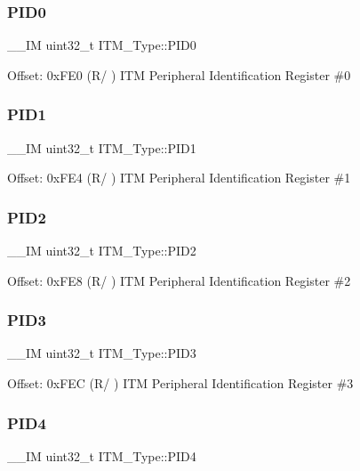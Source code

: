 \subsubsection{\texorpdfstring{PID0}{PID0}}
{\footnotesize\ttfamily \+\_\+\+\_\+\+IM uint32\+\_\+t I\+T\+M\+\_\+\+Type\+::\+P\+I\+D0}

Offset\+: 0x\+F\+E0 (R/ ) I\+TM Peripheral Identification Register \#0 \mbox{\label{structITM__Type_a89ea1d805a668d6589b22d8e678eb6a4}} 
\subsubsection{\texorpdfstring{PID1}{PID1}}
{\footnotesize\ttfamily \+\_\+\+\_\+\+IM uint32\+\_\+t I\+T\+M\+\_\+\+Type\+::\+P\+I\+D1}

Offset\+: 0x\+F\+E4 (R/ ) I\+TM Peripheral Identification Register \#1 \mbox{\label{structITM__Type_a8471c4d77b7107cf580587509da69f38}} 
\subsubsection{\texorpdfstring{PID2}{PID2}}
{\footnotesize\ttfamily \+\_\+\+\_\+\+IM uint32\+\_\+t I\+T\+M\+\_\+\+Type\+::\+P\+I\+D2}

Offset\+: 0x\+F\+E8 (R/ ) I\+TM Peripheral Identification Register \#2 \mbox{\label{structITM__Type_af317d5e2d946d70e6fb67c02b92cc8a3}} 
\subsubsection{\texorpdfstring{PID3}{PID3}}
{\footnotesize\ttfamily \+\_\+\+\_\+\+IM uint32\+\_\+t I\+T\+M\+\_\+\+Type\+::\+P\+I\+D3}

Offset\+: 0x\+F\+EC (R/ ) I\+TM Peripheral Identification Register \#3 \mbox{\label{structITM__Type_aad5e11dd4baf6d941bd6c7450f60a158}} 
\subsubsection{\texorpdfstring{PID4}{PID4}}
{\footnotesize\ttfamily \+\_\+\+\_\+\+IM uint32\+\_\+t I\+T\+M\+\_\+\+Type\+::\+P\+I\+D4}

